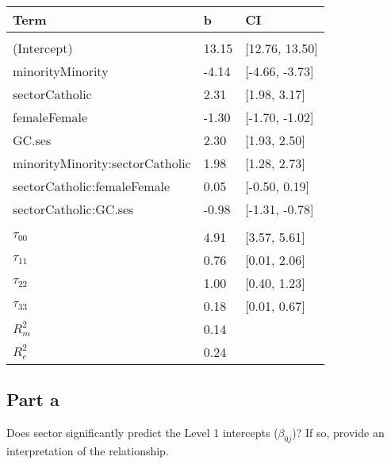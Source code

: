 \documentclass[]{article}
\begin{document}
\begin{table}[H]
\centering
\begin{tabular}{lll}
\toprule
Term & b & CI\\
\midrule
\addlinespace[0.3em]
\multicolumn{3}{l}{\textbf{Fixed}}\\
\hspace{1em}(Intercept) & 13.15 & [12.76, 13.50]\\
\hspace{1em}minorityMinority & -4.14 & [-4.66, -3.73]\\
\hspace{1em}sectorCatholic & 2.31 & [1.98, 3.17]\\
\hspace{1em}femaleFemale & -1.30 & [-1.70, -1.02]\\
\hspace{1em}GC.ses & 2.30 & [1.93, 2.50]\\
\hspace{1em}minorityMinority:sectorCatholic & 1.98 & [1.28, 2.73]\\
\hspace{1em}sectorCatholic:femaleFemale & 0.05 & [-0.50, 0.19]\\
\hspace{1em}sectorCatholic:GC.ses & -0.98 & [-1.31, -0.78]\\
\addlinespace[0.3em]
\multicolumn{3}{l}{\textbf{Random}}\\
\hspace{1em}$\tau_{00}$ & 4.91 & [3.57, 5.61]\\
\hspace{1em}$\tau_{11}$ & 0.76 & [0.01, 2.06]\\
\hspace{1em}$\tau_{22}$ & 1.00 & [0.40, 1.23]\\
\hspace{1em}$\tau_{33}$ & 0.18 & [0.01, 0.67]\\
$R^2_m$ & 0.14 & \\
$R^2_c$ & 0.24 & \\
\bottomrule
\end{tabular}
\end{table}

\subsection{Part a}\label{part-a-2}

Does sector significantly predict the Level 1 intercepts
(\(\beta_{0j}\))? If so, provide an interpretation of the relationship.
\end{document}
